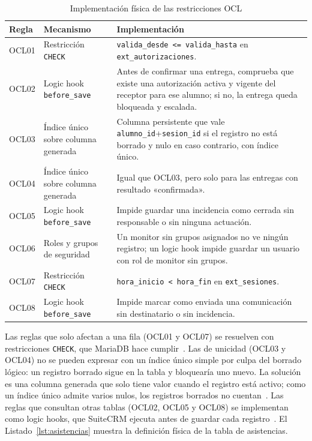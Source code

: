 \begin{table}[H]
\centering\small
\begin{tabularx}{\textwidth}{>{\hsize=0.40\hsize\raggedright\arraybackslash}X>{\hsize=1.05\hsize\raggedright\arraybackslash}X>{\hsize=1.55\hsize\raggedright\arraybackslash}X}
\toprule
\rowcolor{cabeceratabla} \textbf{Regla} & \textbf{Mecanismo} & \textbf{Implementación} \\
\midrule
OCL01 & Restricción \texttt{CHECK} & \texttt{valida\_desde <= valida\_hasta} en \texttt{ext\_autorizaciones}. \\
OCL02 & Logic hook \texttt{before\_save} & Antes de confirmar una entrega, comprueba que existe una autorización activa y vigente del receptor para ese alumno; si no, la entrega queda bloqueada y escalada. \\
OCL03 & Índice único sobre columna generada & Columna persistente que vale \texttt{alumno\_id}+\texttt{sesion\_id} si el registro no está borrado y nulo en caso contrario, con índice único. \\
OCL04 & Índice único sobre columna generada & Igual que OCL03, pero solo para las entregas con resultado «confirmada». \\
OCL05 & Logic hook \texttt{before\_save} & Impide guardar una incidencia como cerrada sin responsable o sin ninguna actuación. \\
OCL06 & Roles y grupos de seguridad & Un monitor sin grupos asignados no ve ningún registro; un logic hook impide guardar un usuario con rol de monitor sin grupos. \\
OCL07 & Restricción \texttt{CHECK} & \texttt{hora\_inicio < hora\_fin} en \texttt{ext\_sesiones}. \\
OCL08 & Logic hook \texttt{before\_save} & Impide marcar como enviada una comunicación sin destinatario o sin incidencia. \\
\bottomrule
\end{tabularx}
\caption{Implementación física de las restricciones OCL}\label{tab:dis-ocl}
\end{table}

Las reglas que solo afectan a una fila (OCL01 y OCL07) se resuelven con restricciones \texttt{CHECK}, que MariaDB hace cumplir~\cite{ref52}. Las de unicidad (OCL03 y OCL04) no se pueden expresar con un índice único simple por culpa del borrado lógico: un registro borrado sigue en la tabla y bloquearía uno nuevo. La solución es una columna generada que solo tiene valor cuando el registro está activo; como un índice único admite varios nulos, los registros borrados no cuentan~\cite{ref52}. Las reglas que consultan otras tablas (OCL02, OCL05 y OCL08) se implementan como logic hooks, que SuiteCRM ejecuta antes de guardar cada registro~\cite{ref50}. El Listado~\ref{lst:asistencias} muestra la definición física de la tabla de asistencias.

